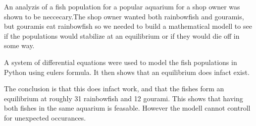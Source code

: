\begin{flushleft}
    An analyzis of a fish population for a popular aquarium for a shop owner was
    shown to be neccecary.The shop owner wanted both rainbowfish and
    gouramis, but gouramis eat rainbowfish so we
    needed to build a mathematical modell to see if the populations
    would stabilize at an equilibrium or if they would die off in some way.

\end{flushleft}

\begin{flushleft}
    A system of differential equations were used to model the fish populations
    in Python using eulers formula. It then shows
    that an equilibrium does infact exist.
\end{flushleft}

\begin{flushleft}
    The conclusion is that this does infact work, and that the fishes
    form an equilibrium at roughly 31 rainbowfish and 12 gourami. This shows
    that having both fishes in the same aquarium is feasable. However the modell
    cannot controll for unexpected occurances.
\end{flushleft}